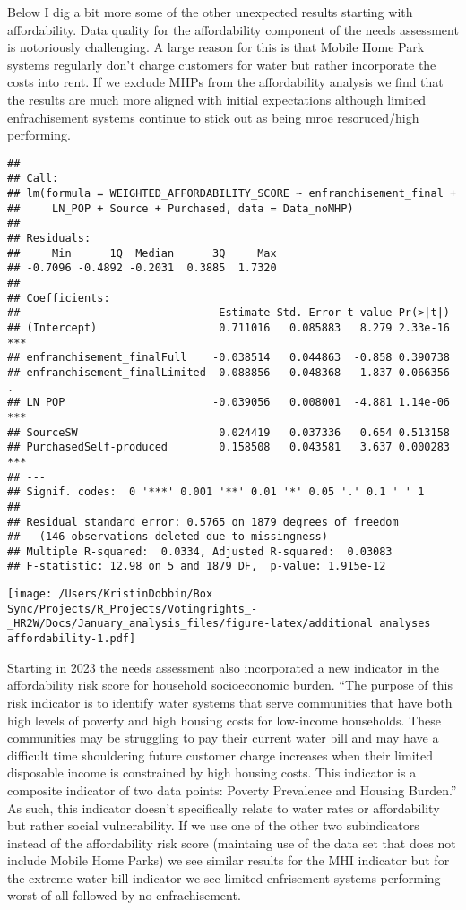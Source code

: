 \documentclass[
]{article}
\begin{document}
Below I dig a bit more some of the other unexpected results starting
with affordability. Data quality for the affordability component of the
needs assessment is notoriously challenging. A large reason for this is
that Mobile Home Park systems regularly don't charge customers for water
but rather incorporate the costs into rent. If we exclude MHPs from the
affordability analysis we find that the results are much more aligned
with initial expectations although limited enfrachisement systems
continue to stick out as being mroe resoruced/high performing.

\begin{verbatim}
## 
## Call:
## lm(formula = WEIGHTED_AFFORDABILITY_SCORE ~ enfranchisement_final + 
##     LN_POP + Source + Purchased, data = Data_noMHP)
## 
## Residuals:
##     Min      1Q  Median      3Q     Max 
## -0.7096 -0.4892 -0.2031  0.3885  1.7320 
## 
## Coefficients:
##                               Estimate Std. Error t value Pr(>|t|)    
## (Intercept)                   0.711016   0.085883   8.279 2.33e-16 ***
## enfranchisement_finalFull    -0.038514   0.044863  -0.858 0.390738    
## enfranchisement_finalLimited -0.088856   0.048368  -1.837 0.066356 .  
## LN_POP                       -0.039056   0.008001  -4.881 1.14e-06 ***
## SourceSW                      0.024419   0.037336   0.654 0.513158    
## PurchasedSelf-produced        0.158508   0.043581   3.637 0.000283 ***
## ---
## Signif. codes:  0 '***' 0.001 '**' 0.01 '*' 0.05 '.' 0.1 ' ' 1
## 
## Residual standard error: 0.5765 on 1879 degrees of freedom
##   (146 observations deleted due to missingness)
## Multiple R-squared:  0.0334, Adjusted R-squared:  0.03083 
## F-statistic: 12.98 on 5 and 1879 DF,  p-value: 1.915e-12
\end{verbatim}

\texttt{[image: /Users/KristinDobbin/Box Sync/Projects/R\_Projects/Votingrights\_-\_HR2W/Docs/January\_analysis\_files/figure-latex/additional analyses affordability-1.pdf]}

Starting in 2023 the needs assessment also incorporated a new indicator
in the affordability risk score for household socioeconomic burden.
``The purpose of this risk indicator is to identify water systems that
serve communities that have both high levels of poverty and high housing
costs for low-income households. These communities may be struggling to
pay their current water bill and may have a difficult time shouldering
future customer charge increases when their limited disposable income is
constrained by high housing costs. This indicator is a composite
indicator of two data points: Poverty Prevalence and Housing Burden.''
As such, this indicator doesn't specifically relate to water rates or
affordability but rather social vulnerability. If we use one of the
other two subindicators instead of the affordability risk score
(maintaing use of the data set that does not include Mobile Home Parks)
we see similar results for the MHI indicator but for the extreme water
bill indicator we see limited enfrisement systems performing worst of
all followed by no enfrachisement.
\end{document}
